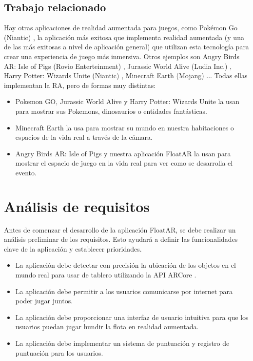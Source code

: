 \documentclass[a4paper, openright, 12pt]{article}
\begin{document}
\subsection{Trabajo relacionado}
Hay otras aplicaciones de realidad aumentada para juegos, como Pokémon Go (Niantic) \cite{PokemonGO}, la aplicación más exitosa que implementa realidad aumentada (y una de las más exitosas a nivel de aplicación general) que utilizan esta tecnología para crear una experiencia de juego más inmersiva. Otros ejemplos son Angry Birds AR: Isle of Pigs (Rovio Enterteinment) \cite{AngryBirds}, Jurassic World Alive (Ludia Inc.) \cite{JurassicWorld}, Harry Potter: Wizards Unite (Niantic) \cite{HarryPotter}, Minecraft Earth (Mojang) \cite{MinecraftEarth}... Todas ellas implementan la RA, pero de formas muy distintas:
\begin{itemize}
    \item Pokemon GO, Jurassic World Alive y Harry Potter: Wizards Unite la usan para mostrar sus Pokemons, dinosaurios o entidades fantásticas.
    \item Minecraft Earth la usa para mostrar su mundo en nuestra habitaciones o espacios de la vida real a través de la cámara.
    \item Angry Birds AR: Isle of Pigs y nuestra aplicación FloatAR la usan para mostrar el espacio de juego en la vida real para ver como se desarrolla el evento.
\end{itemize}

\section{Análisis de requisitos}
Antes de comenzar el desarrollo de la aplicación FloatAR, se debe realizar un análisis preliminar de los requisitos. Esto ayudará a definir las funcionalidades clave de la aplicación y establecer prioridades.
\begin{itemize}
    \item La aplicación debe detectar con precisión la ubicación de los objetos en el mundo real para usar de tablero utilizando la API ARCore \cite{ARCore}.
    \item La aplicación debe permitir a los usuarios comunicarse por internet para poder jugar juntos.
    \item La aplicación debe proporcionar una interfaz de usuario intuitiva para que los usuarios puedan jugar hundir la flota en realidad aumentada.
    \item La aplicación debe implementar un sistema de puntuación y registro de puntuación para los usuarios.
\end{itemize}
\end{document}
